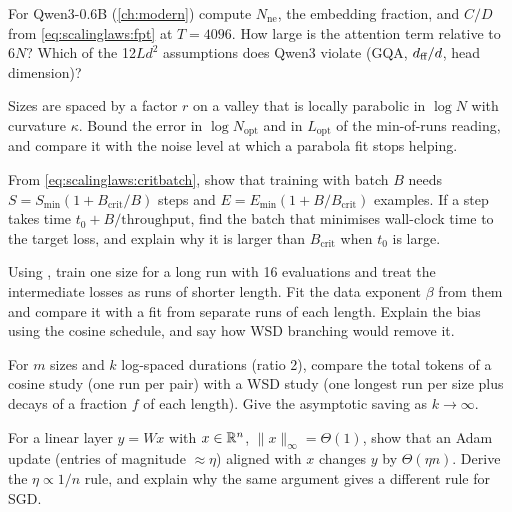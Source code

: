 \begin{exercise}
For Qwen3-0.6B (\cref{ch:modern}) compute $N_{\text{ne}}$, the embedding fraction, and
$C/D$ from \cref{eq:scalinglaws:fpt} at $T=4096$. How large is the attention term relative to
$6N$? Which of the 12$Ld^2$ assumptions does Qwen3 violate (GQA, $d_{\text{ff}}/d$, head dimension)?
\end{exercise}

\begin{exercise}
Sizes are spaced by a factor $r$ on a valley that is locally parabolic in $\log N$ with
curvature $\kappa$. Bound the error in $\log N_{\text{opt}}$ and in $L_{\text{opt}}$ of the
min-of-runs reading, and compare it with the noise level at which a parabola fit stops helping.
\end{exercise}

\begin{exercise}
From \cref{eq:scalinglaws:critbatch}, show that training with batch $B$ needs
$S=S_{\min}(1+B_{\text{crit}}/B)$ steps and $E=E_{\min}(1+B/B_{\text{crit}})$ examples. If a
step takes time $t_0 + B/\text{throughput}$, find the batch that minimises wall-clock time to the
target loss, and explain why it is larger than $B_{\text{crit}}$ when $t_0$ is large.
\end{exercise}

\begin{exercise}\label{ex:scalinglaws:midrun}
Using , train one size for a long run with 16 evaluations and treat the
intermediate losses as runs of shorter length. Fit the data exponent $\beta$ from them and
compare it with a fit from separate runs of each length. Explain the bias using the cosine
schedule, and say how WSD branching would remove it.
\end{exercise}

\begin{exercise}
For $m$ sizes and $k$ log-spaced durations (ratio 2), compare the total tokens of a cosine study
(one run per pair) with a WSD study (one longest run per size plus decays of a fraction $f$ of
each length). Give the asymptotic saving as $k\to\infty$.
\end{exercise}

\begin{exercise}
For a linear layer $y=Wx$ with $x\in\mathbb{R}^n$, $\|x\|_\infty=\Theta(1)$, show that an Adam update
(entries of magnitude $\approx\eta$) aligned with $x$ changes $y$ by $\Theta(\eta n)$. Derive the
$\eta\propto1/n$ rule, and explain why the same argument gives a different rule for SGD.
\end{exercise}

